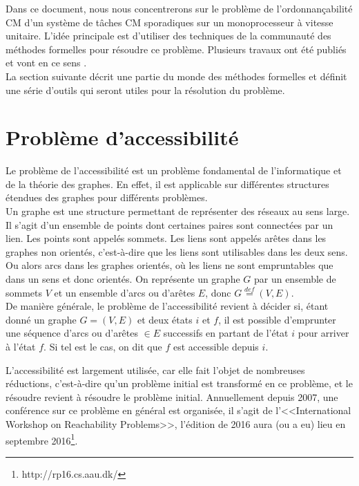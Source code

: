 \documentclass[12pt,a4paper,oneside]{book}
\theoremstyle{break}
\theoremstyle{breakplain}
\begin{document}
Dans ce document, nous nous concentrerons sur le problème de l'ordonnançabilité CM d'un système de tâches CM sporadiques sur un monoprocesseur à vitesse unitaire. L'idée principale est d'utiliser des techniques de la communauté des méthodes formelles pour résoudre ce problème. Plusieurs travaux ont été publiés et vont en ce sens \cite{bakerbrute} \cite{geeraerts2013multiprocessor}.\\

La section suivante décrit une partie du monde des méthodes formelles et définit une série d'outils qui seront utiles pour la résolution du problème.

\section{Problème d'accessibilité}
Le problème de l'accessibilité est un problème fondamental de l'informatique et de la théorie des graphes. En effet, il est applicable sur différentes structures étendues des graphes pour différents problèmes.\\

Un graphe est une structure permettant de représenter des réseaux au sens large. Il s'agit d'un ensemble de points dont certaines paires sont connectées  par un lien. Les points sont appelés sommets. Les liens sont appelés arêtes dans les graphes non orientés, c'est-à-dire que les liens sont utilisables dans les deux sens. Ou alors arcs dans les graphes orientés, où les liens ne sont empruntables que dans un sens et donc orientés. On représente un graphe $G$ par un ensemble de sommets $V$ et un ensemble d'arcs ou d'arêtes $E$, donc $G \overset{def}{=} (V, E)$.\\

De manière générale, le problème de l'accessibilité revient à décider si, étant donné un graphe $G = (V, E)$ et deux états $i$ et $f$, il est possible d'emprunter une séquence d'arcs ou d'arêtes $\in E$ successifs en partant de l'état $i$ pour arriver à l'état $f$. Si tel est le cas, on dit que $f$ est accessible depuis $i$.\\

\pagebreak

L'accessibilité est largement utilisée, car elle fait l'objet de nombreuses réductions, c'est-à-dire qu'un problème initial est transformé en ce problème, et le résoudre revient à résoudre le problème initial. Annuellement depuis 2007, une conférence sur ce problème en général est organisée, il s'agit de l'<<International Workshop on Reachability Problems>>, l'édition de 2016 aura (ou a eu) lieu en septembre 2016\footnote{http://rp16.cs.aau.dk/}.\\
\end{document}
